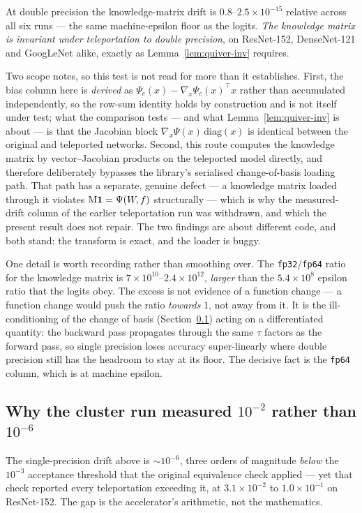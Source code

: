At double precision the knowledge-matrix drift is
$0.8$--$2.5\times10^{-15}$ relative across all six runs --- the same
machine-epsilon floor as the logits. \emph{The knowledge matrix is invariant under teleportation to double
precision}, on ResNet-152, DenseNet-121 and GoogLeNet alike, exactly as
Lemma~\ref{lem:quiver-inv} requires.

Two scope notes, so this test is not read for more than it establishes. First,
the bias column here is \emph{derived} as $\Psi_c(x)-\nabla_x\Psi_c(x)^{\!\top}x$
rather than accumulated independently, so the row-sum identity holds by
construction and is not itself under test; what the comparison tests --- and what
Lemma~\ref{lem:quiver-inv} is about --- is that the Jacobian block
$\nabla_x\Psi(x)\,\mathrm{diag}(x)$ is identical between the original and
teleported networks. Second, this route computes the knowledge matrix by
vector--Jacobian products on the teleported model directly, and therefore
deliberately bypasses the library's serialised change-of-basis loading path. That
path has a separate, genuine defect --- a knowledge matrix loaded through it
violates $\mathrm{M}\mathbf 1=\Psi(W\!,f)$ structurally --- which is why the measured-drift
column of the earlier teleportation run was withdrawn, and which the present
result does not repair. The two findings are about different code, and both
stand: the transform is exact, and the loader is buggy.

One detail is worth recording rather than smoothing over. The
\texttt{fp32}/\texttt{fp64} ratio for the knowledge matrix is
$7\times10^{10}$--$2.4\times10^{12}$,
\emph{larger} than the $5.4\times10^{8}$ epsilon ratio that the logits obey. The
excess is not evidence of a function change --- a function change would push the
ratio \emph{towards} $1$, not away from it. It is the ill-conditioning of the
change of basis (Section~\ref{app:teleport-tf32}) acting on a differentiated
quantity: the backward pass propagates through the same $\tau$ factors as the
forward pass, so single precision loses accuracy super-linearly where double
precision still has the headroom to stay at its floor. The decisive fact is the
\texttt{fp64} column, which is at machine epsilon.

\subsection{Why the cluster run measured $10^{-2}$ rather than $10^{-6}$}
\label{app:teleport-tf32}

The single-precision drift above is $\sim\!10^{-6}$, three orders of magnitude
\emph{below} the $10^{-3}$ acceptance threshold that the original
equivalence check applied --- yet that check reported every teleportation
exceeding it, at $3.1\times10^{-2}$ to $1.0\times10^{-1}$ on ResNet-152. The gap
is the accelerator's arithmetic, not the mathematics.

